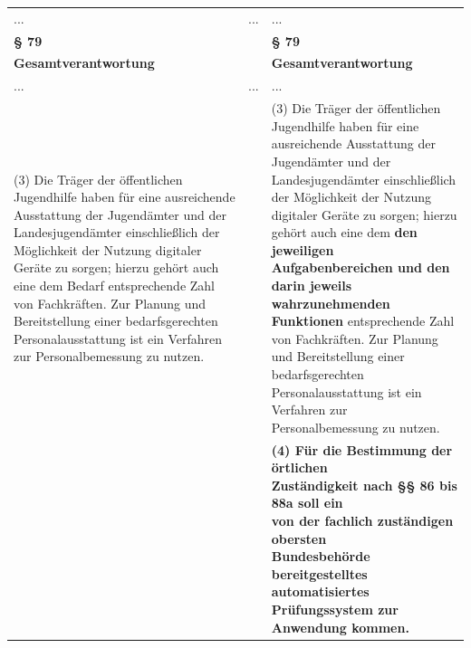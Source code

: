 \documentclass[10pt,a4paper,landscape]{article}
\begin{document}
\begin{longtable}{|L{8.2cm}|L{8.2cm}|L{8.2cm}|}
... & ... & ... \\
\hhline{|---|}
\textbf{\S{} 79} &  & \textbf{\S{} 79} \\
\hhline{|---|}
\textbf{Gesamtverantwortung} &  & \textbf{Gesamtverantwortung} \\
\hhline{|---|}
... & ... & ... \\
\hhline{|---|}
(3) Die Träger der öffentlichen Jugendhilfe  \newline haben für eine ausreichende Ausstattung  \newline der Jugendämter und der  \newline Landesjugendämter einschließlich der  \newline Möglichkeit der Nutzung digitaler Geräte zu  \newline sorgen; hierzu gehört auch eine dem  \newline \textcolor{diffred}{Bedarf} entsprechende Zahl von  \newline Fachkräften. Zur Planung und  \newline Bereitstellung einer bedarfsgerechten  \newline Personalausstattung ist ein Verfahren zur  \newline Personalbemessung zu nutzen. &  & (3) Die Träger der öffentlichen Jugendhilfe  \newline haben für eine ausreichende Ausstattung  \newline der Jugendämter und der  \newline Landesjugendämter einschließlich der  \newline Möglichkeit der Nutzung digitaler Geräte zu  \newline sorgen; hierzu gehört auch eine dem \textbf{\textcolor{diffgreen}{den  \newline jeweiligen Aufgabenbereichen und den  \newline darin jeweils wahrzunehmenden  \newline Funktionen}} entsprechende Zahl von  \newline Fachkräften. Zur Planung und  \newline Bereitstellung einer bedarfsgerechten  \newline Personalausstattung ist ein Verfahren zur  \newline Personalbemessung zu nutzen. \\
\hhline{|---|}
 &  & \textbf{\textcolor{diffgreen}{(4) Für die Bestimmung der örtlichen  \newline Zuständigkeit nach \S{}\S{} 86 bis 88a soll ein  \newline von der fachlich zuständigen obersten  \newline Bundesbehörde bereitgestelltes  \newline automatisiertes Prüfungssystem zur  \newline Anwendung kommen.}} \\

\end{longtable}
\end{document}
